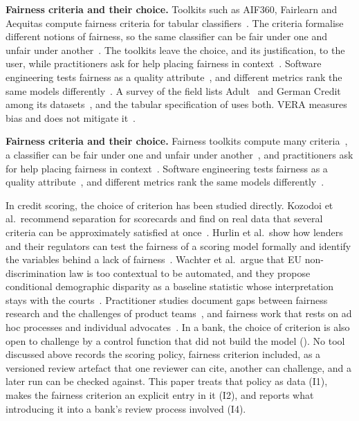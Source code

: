 \ifarmreduced
\textbf{Fairness criteria and their choice.}
Toolkits such as AIF360, Fairlearn and Aequitas compute fairness criteria for tabular classifiers~\cite{bellamy2019aif360,weerts2023fairlearn,saleiro2018aequitas}.
The criteria formalise different notions of fairness, so the same classifier can be fair under one and unfair under another~\cite{verma2018fairness,barocas2023fairness}.
The toolkits leave the choice, and its justification, to the user, while practitioners ask for help placing fairness in context~\cite{lee2021landscape,deng2022exploring}.
Software engineering tests fairness as a quality attribute~\cite{brun2018software,galhotra2017fairness,chakraborty2021bias}, and different metrics rank the same models differently~\cite{biswas2020machine}.
A survey of the field lists Adult~\cite{becker1996adult} and German Credit~\cite{hofmann1994statlog} among its datasets~\cite{chen2024fairness}, and the tabular specification of  uses both.
VERA measures bias and does not mitigate it~\cite{hort2024bias}.
\fi

\ifarmwithdrawn
\textbf{Fairness criteria and their choice.}
Fairness toolkits compute many criteria~\cite{bellamy2019aif360,weerts2023fairlearn}, a classifier can be fair under one and unfair under another~\cite{verma2018fairness,barocas2023fairness}, and practitioners ask for help placing fairness in context~\cite{lee2021landscape,deng2022exploring}.
Software engineering tests fairness as a quality attribute~\cite{brun2018software,galhotra2017fairness,chen2024fairness}, and different metrics rank the same models differently~\cite{biswas2020machine}.
\fi

In credit scoring, the choice of criterion has been studied directly.
Kozodoi et al.\ recommend separation for scorecards and find on real data that several criteria can be approximately satisfied at once~\cite{kozodoi2022fairness}.
Hurlin et al.\ show how lenders and their regulators can test the fairness of a scoring model formally and identify the variables behind a lack of fairness~\cite{hurlin2026fairness}.
Wachter et al.\ argue that EU non-discrimination law is too contextual to be automated, and they propose conditional demographic disparity as a baseline statistic whose interpretation stays with the courts~\cite{wachter2021fairness}.
Practitioner studies document gaps between fairness research and the challenges of product teams~\cite{holstein2019improving}, and fairness work that rests on ad hoc processes and individual advocates~\cite{madaio2020codesigning}.
In a bank, the choice of criterion is also open to challenge by a control function that did not build the model ().
No tool discussed above records the scoring policy, fairness criterion included, as a versioned review artefact that one reviewer can cite, another can challenge, and a later run can be checked against.
This paper treats that policy as data (I1), makes the fairness criterion an explicit entry in it (I2), and reports what introducing it into a bank's review process involved (I4).

